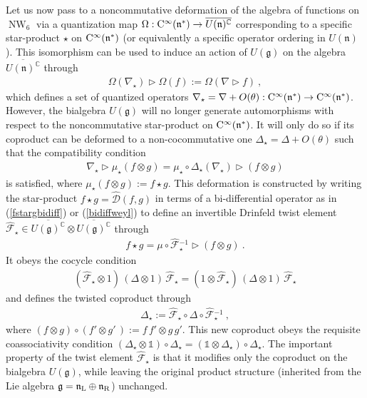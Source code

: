 \documentclass[11pt,a4paper]{article}
\DeclareMathOperator{\NW}{NW}
\newcommand{\1}{\mathbb{1}}
\def\one{\mathbb{1}}
\def\CC{{\rm C}}
\def\mfn{{\mathfrak n}}
\def\mfg{{\mathfrak g}}
\newcommand{\complex}{{\mathbb C}} %
\newcommand{\beq}{\begin{eqnarray}}
\newcommand{\eeq}{\end{eqnarray}}
\begin{document}
Let us now pass to a noncommutative deformation of the algebra of
functions on $\NW_6$ via a quantization map
$\Omega:\CC^\infty(\mfn^*)\to\overline{U(\mfn)^\complex}$
corresponding to a specific star-product $\star$ on
$\CC^\infty(\mfn^*)$ (or equivalently a specific operator ordering in
$U(\mfn)$). This isomorphism can be used to induce an action of
$U(\mfg)$ on the algebra $\overline{U(\mfn)^\complex}$ through
\beq
\Omega(\nabla_\star)\triangleright\Omega(f):=
\Omega(\nabla\triangleright f) \ ,
\label{nablastar}\eeq
which defines a set of quantized operators
$\nabla_\star=\nabla+O(\theta):\CC^\infty(\mfn^*)\to\CC^\infty(\mfn^*)$.
However, the bialgebra $U(\mfg)$ will no longer generate automorphisms
with respect to the noncommutative star-product on
$\CC^\infty(\mfn^*)$. It will only do so if its coproduct can be
deformed to a non-cocommutative one $\Delta_\star=\Delta+O(\theta)$
such that the compatibility condition
\beq
\nabla_\star\triangleright\mu_\star(f\otimes g)=\mu_\star\circ
\Delta_\star(\nabla_\star)\triangleright(f\otimes g)
\label{NCcoprodcomp}\eeq
is satisfied, where $\mu_\star(f\otimes g):=f\star g$. This deformation is
constructed by writing the star-product $f\star
g=\hat{\mathcal D}(f,g)$ in terms of a bi-differential operator as in
(\ref{fstargbidiff}) or (\ref{bidiffweyl}) to define an invertible
Drinfeld twist element $\hat{\mathcal F}_\star\in
\overline{U(\mfg)^\complex}\otimes\overline{U(\mfg)^\complex}$ through
\beq
f\star g=\mu\circ\hat{\mathcal F}{}_\star^{-1}\triangleright(f\otimes
g) \ .
\label{Dtwistdef}\eeq
It obeys the cocycle condition
\beq
(\hat{\mathcal F}_\star\otimes1)\,(\Delta\otimes1)\,\hat
{\mathcal F}_\star=(1\otimes\hat{\mathcal F}_\star)\,
(\Delta\otimes1)\,\hat{\mathcal F}_\star
\label{twistcocycle}\eeq
and defines the twisted coproduct through
\beq
\Delta_\star:=\hat{\mathcal F}_\star^{~}\circ\Delta\circ
\hat{\mathcal F}{}_\star^{-1} \ ,
\label{Deltastardef}\eeq
where $(f\otimes g)\circ(f'\otimes g'\,):=f\,f'\otimes g\,g'$. This new
coproduct obeys the requisite coassociativity condition
$(\Delta_\star\otimes\one)\circ\Delta_\star=(\one\otimes\Delta_\star)
\circ\Delta_\star$. The important property of the twist element
$\hat{\mathcal F}_\star$ is that it modifies only the coproduct on the
bialgebra $U(\mfg)$, while leaving the original product structure
(inherited from the Lie algebra $\mfg=\mfn_{\rm L}\oplus\mfn_{\rm
  R}$) unchanged.
\end{document}
